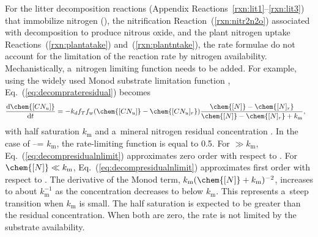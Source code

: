 \documentclass[gmdd, online, hvmath]{copernicus}
\begin{document}
      For the litter decomposition reactions (Appendix Reactions~\ref{rxn:lit1}--\ref{rxn:lit3}) that immobilize nitrogen (),
      the nitrification Reaction~(\ref{rxn:nitr2n2o}) associated with
      decomposition to produce nitrous oxide, and the plant nitrogen uptake
      Reactions~(\ref{rxn:plantatake}) and~(\ref{rxn:plantntake}), the rate
      formulae do not account for the limitation of the reaction rate by
      nitrogen availability.  Mechanistically, a~nitrogen limiting function
      needs to be added. For example, using the widely used Monod substrate
      limitation function \citep{Fennell1998},
      Eq.~(\ref{eq:decomprateresidual}) becomes
\begin{align}
 &
\frac{\mathrm{d} \chem{[CN_u]}}{\mathrm{d} t} =
-k_{d} f_{T} f_{w} (\chem{[CN_u]} - \chem{[CN_u]_r}) \frac{\chem{[N]}-\chem{[N]_r}}{\chem{[N]}-\chem{[N]_r} +k_\mathrm{m}},
\label{eq:decompresidualnlimit}
\end{align}%
      with half saturation $k_\mathrm{m}$ and a~mineral nitrogen residual
      concentration . In the case of \chem{[N]}--=
      $k_\mathrm{m}$, the rate-limiting function is equal to 0.5. For
      \chem{[N]} $\gg k_\mathrm{m}$, Eq.~(\ref{eq:decompresidualnlimit})
      approximates zero order with respect to \chem{[N]}. For $\chem{[N]}\ll
      k_\mathrm{m}$, Eq.~(\ref{eq:decompresidualnlimit}) approximates first
      order with respect to \chem{[N]}. The derivative of the Monod term,
      ${k_\mathrm{m}}{(\chem{[N]}+k_\mathrm{m})^{-2}}$, increases to about
      $k_\mathrm{m}^{-1}$ as the concentration decreases to below
      $k_\mathrm{m}$. This represents a~steep transition when $k_\mathrm{m}$ is
      small. The half saturation is expected to be greater than the residual
      concentration. When both are zero, the rate is not limited by the
      substrate availability.
\end{document}
